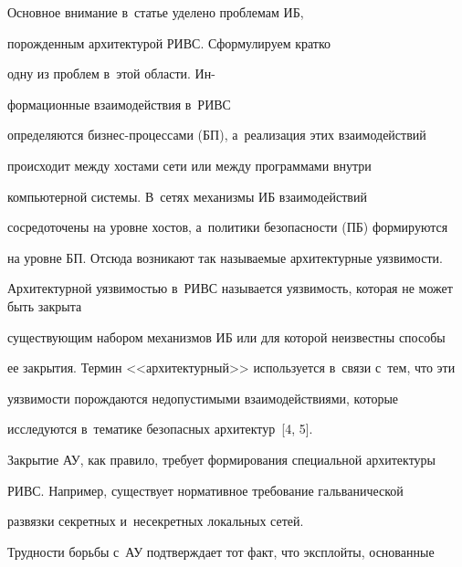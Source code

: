   


  Основное внимание в~статье уделено проблемам ИБ, 


  порожденным архитектурой РИВС. Сформулируем кратко 


одну из  проблем в~этой области. Ин-\linebreak\vspace*{-12pt}





\pagebreak





\noindent


формационные взаимодействия в~РИВС 


определяются биз\-нес-про\-цес\-са\-ми (БП), а~реализация этих взаимодействий 


происходит между хостами сети или между программами внутри 


компьютерной системы. В~сетях механизмы ИБ взаимодействий 


сосредоточены на уровне хостов, а~политики безопасности (ПБ) формируются 


на уровне БП. Отсюда возникают так называемые архитектурные уязвимости. 


Архитектурной уязвимостью в~РИВС называется уязвимость, которая не может быть закрыта 


существующим набором механизмов ИБ или для которой неизвестны способы 


ее закрытия. Термин <<архитектурный>> используется в~связи с~тем, что эти 


уязвимости порождаются недопустимыми взаимодействиями, которые 


исследуются в~тематике безопасных архитектур~[4, 5].


{





}


  


  Закрытие АУ, как правило, требует формирования специальной архитектуры 


РИВС. Например, существует нормативное требование гальванической 


развязки секретных и~несекретных локальных сетей. 


  


  Трудности борьбы с~АУ подтверждает тот факт, что эксплойты, основанные 


